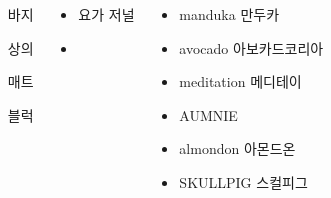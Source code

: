 \documentclass[25pt, a1paper ]{tikzposter}
\begin{document}
\begin{columns}

			{				
			\setlength{\leftmargini}{5em}			
			\setlength{\labelsep}{1em} %
			\begin{LARGE}
			\begin{itemize}
			\item [바지]
			\item [상의]
			\item [매트]
			\item [블럭]
			\end{itemize}
			\end{LARGE}
		}


			{				
			\setlength{\leftmargini}{3em}			
			\setlength{\labelsep}{1em} %
			\begin{LARGE}
			\begin{itemize}
			\item 요가 저널
			\item 
			\end{itemize}
			\end{LARGE}
		}


			{				
			\setlength{\leftmargini}{3em}			
			\setlength{\labelsep}{1em} %
			\begin{LARGE}
			\begin{itemize}
			\item manduka 만두카
			\item avocado 아보카드코리아
			\item meditation 메디테이
			\item AUMNIE
			\item almondon 아몬드온
			\item SKULLPIG 스컬피그

			\end{itemize}
			\end{LARGE}
		}


	\end{columns}
\end{document}
